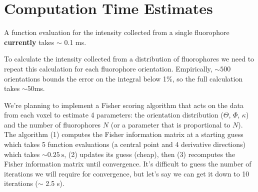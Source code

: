 \documentclass[11pt]{article}
\providecommand{\DIFadd}[1]{{\protect\color{blue}\uwave{#1}}} %
\providecommand{\DIFdel}[1]{{\protect\color{red}\sout{#1}}}
\providecommand{\mb}[1]{\mathbf{#1}}
\providecommand{\bs}[1]{\boldsymbol{#1}}
\providecommand{\fig}[4]{
\begin{figure}[h]
 \captionsetup{width=1.0\linewidth}
 \centering
 \texttt{[image: \#1]}
 \caption{#3}
 \label{fig:#4}
\end{figure}
}
\begin{document}

\section{Computation Time Estimates}
A function evaluation for the intensity collected from a single fluorophore
\textbf{currently} takes $\sim$ 0.1 ms.

To calculate the intensity collected from a distribution of fluorophores we need
to repeat this calculation for each fluorophore orientation. Empirically,
$\sim 500$ orientations bounds the error on the integral below 1\%, so the full
calculation takes $\sim 50$ms.

We're planning to implement a Fisher scoring algorithm that acts on the data
from each voxel to estimate 4 parameters: the orientation distribution
($\Theta$, $\Phi$, $\kappa$) and the number of fluorophores $N$ (or a parameter
that is proportional to $N$). The algorithm (1) computes the Fisher information
matrix at a starting guess which takes 5 function evaluations (a central point
and 4 derivative directions) which takes $\sim 0.25\ \text{s}$, (2) updates its
guess (cheap), then (3) recomputes the Fisher information matrix until
convergence. It's difficult to guess the number of iterations we will require
for convergence, but let's say we can get it down to 10 iterations ($\sim$ 2.5
s).
\end{document}
